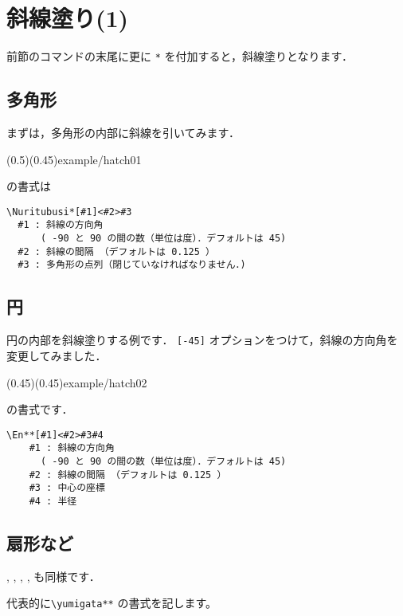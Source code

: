 \section{斜線塗り(1)}
前節のコマンドの末尾に更に \texttt{*} を付加すると，斜線塗りとなります．

\subsection{多角形}
まずは，多角形の内部に斜線を引いてみます．

\showexample[多角形の内部に斜線](0.5)(0.45){example/hatch01}

 の書式は

\begin{boxnote}
\begin{verbatim}
\Nuritubusi*[#1]<#2>#3
  #1 : 斜線の方向角
      ( -90 と 90 の間の数（単位は度）．デフォルトは 45)
  #2 : 斜線の間隔 （デフォルトは 0.125 ）
  #3 : 多角形の点列（閉じていなければなりません．)
\end{verbatim}
\end{boxnote}\medskip

\subsection{円}
円の内部を斜線塗りする例です．
\verb+[-45]+ オプションをつけて，斜線の方向角を変更してみました．

\showexample[円の内部に斜線](0.45)(0.45){example/hatch02}

 の書式です．

\begin{boxnote}
\begin{verbatim}
\En**[#1]<#2>#3#4
    #1 : 斜線の方向角
      ( -90 と 90 の間の数（単位は度）．デフォルトは 45)
    #2 : 斜線の間隔 （デフォルトは 0.125 ）
    #3 : 中心の座標
    #4 : 半径
\end{verbatim}
\end{boxnote}

\subsection{扇形など}
, , , ,
 も同様です．

代表的に\verb/\yumigata**/ の書式を記します。


